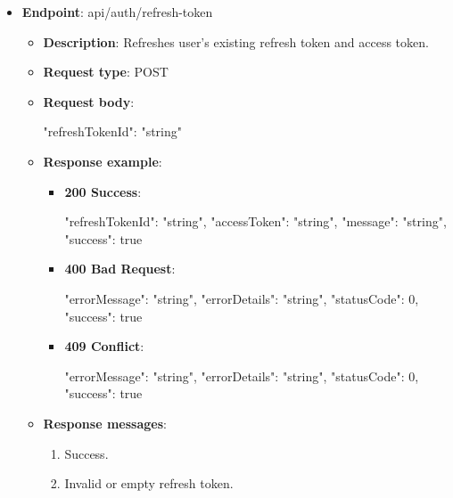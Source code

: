 \begin{itemize}
    \item \textbf{Endpoint}: api/auth/refresh-token
    \begin{itemize}
        \item \textbf{Description}: Refreshes user's existing refresh token and access token.
        \item \textbf{Request type}: POST
        \item \textbf{Request body}:
        \begin{spverbatim}
        {
            "refreshTokenId": "string"
        }
        \end{spverbatim}
        \item  \textbf{Response example}:
        \begin{itemize}
            \item \textbf{200 Success}:
            \begin{spverbatim}
            {
                "refreshTokenId": "string",
                "accessToken": "string",
                "message": "string",
                "success": true
            }
            \end{spverbatim}
            \item \textbf{400 Bad Request}:
            \begin{spverbatim}
            {
                "errorMessage": "string",
                "errorDetails": "string",
                "statusCode": 0,
                "success": true
            }
            \end{spverbatim}
            \item \textbf{409 Conflict}:
            \begin{spverbatim}
            {
                "errorMessage": "string",
                "errorDetails": "string",
                "statusCode": 0,
                "success": true
            }
            \end{spverbatim}
        \end{itemize}
        \item \textbf{Response messages}:
        \begin{enumerate}
            \item Success.
            \item Invalid or empty refresh token.
        \end{enumerate}
    \end{itemize}


\end{itemize}
